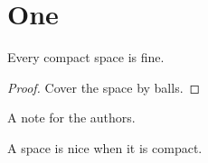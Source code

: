 \documentclass[english]{cfgjour}
\begin{document}
\section{One}
\begin{lemma} Every compact space is fine. \end{lemma}
\begin{proof} Cover the space by balls. \end{proof}
\begin{hproof} A note for the authors. \end{hproof}
\begin{defn} A space is nice when it is compact. \end{defn}
\end{document}
